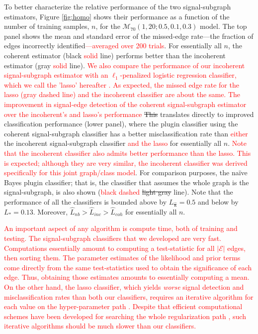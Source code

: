 \documentclass[10pt,journal,cspaper,compsoc]{IEEEtran}
\providecommand{\tr}[1]{\textcolor{red}{#1}}
\providecommand{\mc}[1]{\mathcal{#1}}
\providecommand{\wh}[1]{\widehat{#1}}
\providecommand{\mhb}[1]{\hat{\boldsymbol{#1}}}
\begin{document}
To better characterize the relative performance of the two signal-subgraph estimators, Figure \ref{fig:homo} shows their performance as a function of the number of training samples, $n$, for the $\mc{M}_{70}(1,20;0.5,0.1,0.3)$ model.  The top panel shows the mean and standard error of the missed-edge rate---the fraction of edges incorrectly identified\tr{---averaged over 200 trials}.  For essentially all $n$, the coherent estimator (black \tr{solid} line) performs better than the incoherent estimator (gray \tr{solid} line).  \tr{We also compare the performance of our incoherent signal-subgraph estimator with an $\ell_1$-penalized logistic regression classifier, which we call the 'lasso' hereafter \cite{Tibs96}.  As expected, the missed edge rate for the lasso (gray dashed line) and the incoherent classifier are about the same. The improvement in signal-edge detection of the coherent signal-subgraph estimator over the incoherent's and lasso's performance} \sout{This} translates directly to improved classification performance (lower panel), where the plugin classifier using the coherent signal-subgraph classifier has a better misclassification rate than \tr{either} the incoherent signal-subgraph classifier \tr{and the lasso} for essentially all $n$. \tr{Note that the incoherent classifier also admits better performance than the lasso.  This is expected; although they are very similar, the incoherent classifier was derived specifically for this joint graph/class model}.  For comparison purposes, the na\"ive Bayes plugin classifier; that is, the classifier that assumes the whole graph is the signal-subgraph, is also shown (\tr{black dashed} \sout{light gray} line).  Note that the performance of all the classifiers is bounded above by $L_{\mhb{\pi}} = 0.5$ and below by $L_* = 0.13$.  Moreover,  $\wh{L}_{nb} > \wh{L}_{inc} > \wh{L}_{coh}$ for essentially all $n$.  

\tr{An important aspect of any algorithm is compute time, both of training and testing. The signal-subgraph classifiers that we developed are very fast.  Computations essentially amount to computing a test-statistic for all $|\mc{E}|$ edges, then sorting them.  The parameter estimates of the likelihood and prior terms come directly from the same test-statistics used to obtain the significance of each edge.  Thus, obtaining those estimates amounts to essentially computing a mean.  On the other hand, the lasso classifier, which yields \emph{worse} signal detection and misclassification rates than both our classifiers, requires an iterative algorithm for each value on the hyper-parameter path \cite{Tibs96}.  Despite that efficient computational schemes have been developed for searching the whole regularization path \cite{Efron2004}, such iterative algorithms should be much slower than our classifiers. }
\end{document}
